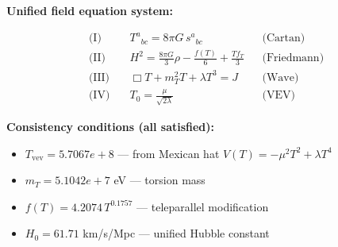 
\textbf{Unified field equation system:}

\begin{align}
  \text{(I)} \quad & T^a{}_{bc} = 8\pi G \, s^a{}_{bc} && \text{(Cartan)} \\
  \text{(II)} \quad & H^2 = \frac{8\pi G}{3}\rho - \frac{f(T)}{6} + \frac{Tf_T}{3} && \text{(Friedmann)} \\
  \text{(III)} \quad & \Box T + m_T^2 T + \lambda T^3 = J && \text{(Wave)} \\
  \text{(IV)} \quad & T_0 = \frac{\mu}{\sqrt{2\lambda}} && \text{(VEV)}
\end{align}

\textbf{Consistency conditions (all satisfied):}
\begin{itemize}
  \item $T_{\text{vev}} = 5.7067e+8$ — from Mexican hat $V(T) = -\mu^2 T^2 + \lambda T^4$
  \item $m_T = 5.1042e+7$ eV — torsion mass
  \item $f(T) = 4.2074 \, T^{0.1757}$ — teleparallel modification
  \item $H_0 = 61.71$ km/s/Mpc — unified Hubble constant
\end{itemize}